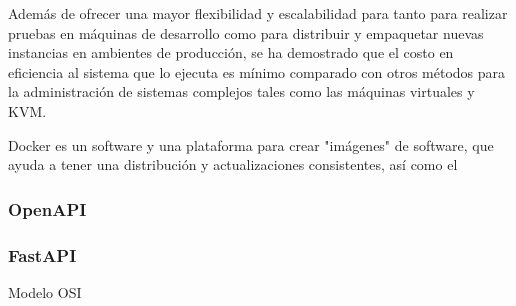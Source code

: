 Además de ofrecer una mayor flexibilidad y escalabilidad para tanto para realizar pruebas en máquinas de desarrollo como para distribuir y empaquetar nuevas instancias en ambientes de producción, se ha demostrado que el costo en eficiencia al sistema que lo ejecuta es mínimo comparado con otros métodos para la administración de sistemas complejos tales como las máquinas virtuales y KVM\cite{felter2015comparsionPerformance, rad2017dockerAnalysis}.

Docker es un software y una plataforma para crear "imágenes" de software, que ayuda a tener una distribución y actualizaciones consistentes, así como el

\subsubsection{OpenAPI}

\subsubsection{FastAPI}

Modelo OSI


